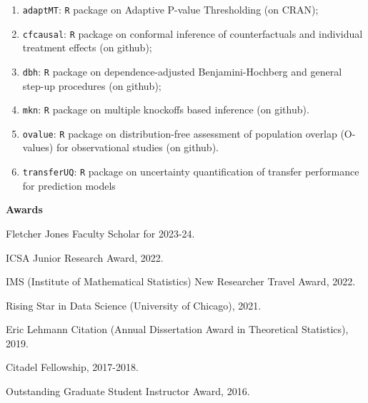 \documentclass{article}
\begin{document}
\begin{enumerate}
\item \texttt{adaptMT}: \texttt{R} package on Adaptive P-value Thresholding (on CRAN);
\item \texttt{cfcausal}: \texttt{R} package on conformal inference of counterfactuals and individual treatment effects (on github);
\item \texttt{dbh}: \texttt{R} package on dependence-adjusted Benjamini-Hochberg and general step-up procedures (on github);
\item \texttt{mkn}: \texttt{R} package on multiple knockoffs based inference (on github).
\item \texttt{ovalue}: \texttt{R} package on distribution-free assessment of population overlap (O-values) for observational studies (on github).
\item \texttt{transferUQ}: \texttt{R} package on uncertainty quantification of transfer performance for prediction models
\end{enumerate}

\vspace{3mm}
\begin{large}
\noindent \textbf{Awards}
\end{large}

\vspace{5mm}

Fletcher Jones Faculty Scholar for 2023-24. 

\vspace{2mm}

ICSA Junior Research Award, 2022.

\vspace{2mm}

IMS (Institute of Mathematical Statistics) New Researcher Travel Award, 2022.

\vspace{2mm}

Rising Star in Data Science (University of Chicago), 2021.

\vspace{2mm}

Eric Lehmann Citation (Annual Dissertation Award in Theoretical Statistics), 2019.

\vspace{2mm}

Citadel Fellowship, 2017-2018.

\vspace{2mm}

Outstanding Graduate Student Instructor Award, 2016.
\end{document}
